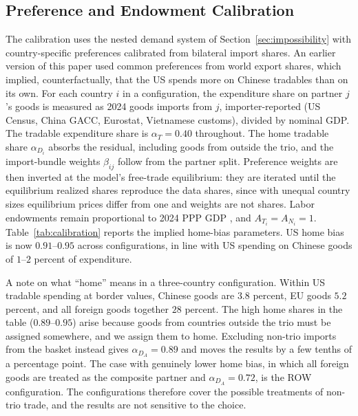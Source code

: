 \documentclass[11pt]{article}
\theoremstyle{plain}
\theoremstyle{remark}
\numberwithin{lemma}{section}
\numberwithin{proposition}{section}
\numberwithin{corollary}{section}
\newenvironment{revblock}{\par\begingroup\color{RevBlue}}{\endgroup\par}
\begin{document}
\subsection{Preference and Endowment Calibration}

\begin{revblock}
The calibration uses the nested demand system of Section~\ref{sec:impossibility} with country-specific preferences calibrated from bilateral import shares. An earlier version of this paper used common preferences from world export shares, which implied, counterfactually, that the US spends more on Chinese tradables than on its own. For each country $i$ in a configuration, the expenditure share on partner $j$'s goods is measured as 2024 goods imports from $j$, importer-reported (US Census, China GACC, Eurostat, Vietnamese customs), divided by nominal GDP. The tradable expenditure share is $\alpha_T = 0.40$ throughout. The home tradable share $\alpha_{D_i}$ absorbs the residual, including goods from outside the trio, and the import-bundle weights $\beta_{ij}$ follow from the partner split. Preference weights are then inverted at the model's free-trade equilibrium: they are iterated until the equilibrium realized shares reproduce the data shares, since with unequal country sizes equilibrium prices differ from one and weights are not shares. Labor endowments remain proportional to 2024 PPP GDP \citep{imf2024weo}, and $A_{T_i} = A_{N_i} = 1$. Table~\ref{tab:calibration} reports the implied home-bias parameters. US home bias is now $0.91$--$0.95$ across configurations, in line with US spending on Chinese goods of $1$--$2$ percent of expenditure.

A note on what ``home'' means in a three-country configuration. Within US tradable spending at border values, Chinese goods are $3.8$ percent, EU goods $5.2$ percent, and all foreign goods together $28$ percent. The high home shares in the table ($0.89$--$0.95$) arise because goods from countries outside the trio must be assigned somewhere, and we assign them to home. Excluding non-trio imports from the basket instead gives $\alpha_{D_A} = 0.89$ and moves the results by a few tenths of a percentage point. The case with genuinely lower home bias, in which all foreign goods are treated as the composite partner and $\alpha_{D_A} = 0.72$, is the ROW configuration. The configurations therefore cover the possible treatments of non-trio trade, and the results are not sensitive to the choice.


\end{revblock}
\end{document}
